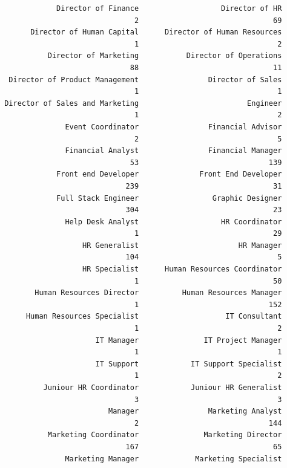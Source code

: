 \documentclass[
  letterpaper,
  DIV=11,
  numbers=noendperiod]{scrartcl}
\begin{document}
\begin{verbatim}
             Director of Finance                   Director of HR 
                               2                               69 
       Director of Human Capital      Director of Human Resources 
                               1                                2 
           Director of Marketing           Director of Operations 
                              88                               11 
  Director of Product Management                Director of Sales 
                               1                                1 
 Director of Sales and Marketing                         Engineer 
                               1                                2 
               Event Coordinator                Financial Advisor 
                               2                                5 
               Financial Analyst                Financial Manager 
                              53                              139 
             Front end Developer              Front End Developer 
                             239                               31 
             Full Stack Engineer                 Graphic Designer 
                             304                               23 
               Help Desk Analyst                   HR Coordinator 
                               1                               29 
                   HR Generalist                       HR Manager 
                             104                                5 
                   HR Specialist      Human Resources Coordinator 
                               1                               50 
        Human Resources Director          Human Resources Manager 
                               1                              152 
      Human Resources Specialist                    IT Consultant 
                               1                                2 
                      IT Manager               IT Project Manager 
                               1                                1 
                      IT Support            IT Support Specialist 
                               1                                2 
          Juniour HR Coordinator            Juniour HR Generalist 
                               3                                3 
                         Manager                Marketing Analyst 
                               2                              144 
           Marketing Coordinator               Marketing Director 
                             167                               65 
               Marketing Manager             Marketing Specialist 

\end{verbatim}
\end{document}
